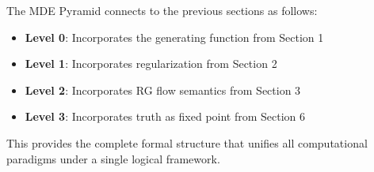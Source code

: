The MDE Pyramid connects to the previous sections as follows:
\begin{itemize}
\item \textbf{Level 0}: Incorporates the generating function from Section 1
\item \textbf{Level 1}: Incorporates regularization from Section 2
\item \textbf{Level 2}: Incorporates RG flow semantics from Section 3
\item \textbf{Level 3}: Incorporates truth as fixed point from Section 6
\end{itemize}

This provides the complete formal structure that unifies all computational paradigms under a single logical framework.
